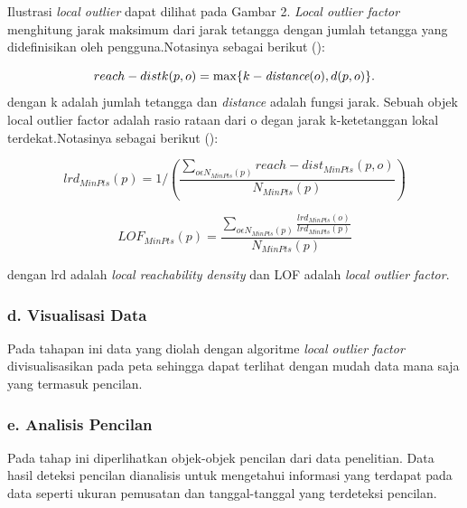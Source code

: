  Ilustrasi \textit{local outlier}  dapat dilihat pada Gambar 2.\textit{ Local outlier factor } menghitung jarak maksimum dari jarak tetangga dengan jumlah tetangga yang didefinisikan oleh pengguna.Notasinya sebagai berikut (\cite{Beunig2010}):


\begin{equation}
	reach-dist\space k(p, o) = \max \{\space  k-\textit{distance}(o), d(p, o) \}.
\end{equation}
dengan
k 	adalah jumlah tetangga dan \textit{distance} adalah fungsi jarak. Sebuah objek local outlier factor  adalah rasio rataan dari o degan jarak k-ketetanggan lokal terdekat.Notasinya sebagai berikut (\cite{Beunig2010}):

\begin{equation}
lrd_{MinPts}(p) = 1/(\frac{\displaystyle\sum_{o \epsilon N_{MinPts}(p)}  reach-dist_{MinPts}(p,o) } { N_{MinPts}(p)} )
\end{equation}

\begin{equation}
LOF_{MinPts}(p)= \frac{\displaystyle\sum_{o \epsilon N_{MinPts}(p)} \frac{lrd_{MinPts}(o)}{lrd_{MinPts}(p)}}{N_{MinPts}(p)}
\end{equation}

dengan lrd adalah \textit{local reachability density} dan LOF adalah \textit{local outlier factor}.

\subsubsection*{d. Visualisasi Data}
Pada tahapan ini data yang diolah dengan algoritme \textit{local outlier factor} divisualisasikan pada peta sehingga dapat terlihat dengan mudah data mana saja yang termasuk pencilan.

\subsubsection*{e. Analisis Pencilan}
Pada tahap ini diperlihatkan objek-objek pencilan dari data penelitian. Data hasil deteksi pencilan dianalisis untuk mengetahui informasi yang terdapat pada data seperti ukuran pemusatan dan tanggal-tanggal yang terdeteksi pencilan.

